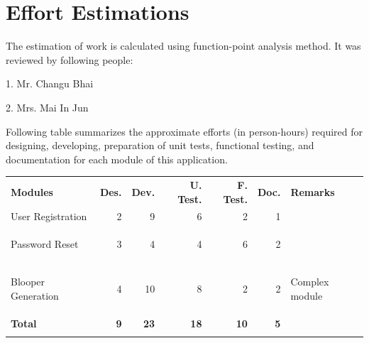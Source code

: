\documentclass{article}%
\begin{document}
\section{Effort Estimations}%

%
The estimation of work is calculated using function{-}point analysis method. It was reviewed by following people:%
\par%
1. Mr. Changu Bhai%
\par%
2. Mrs. Mai In Jun%
\par%
Following table summarizes the approximate efforts (in person{-}hours) required for designing, developing, preparation of unit tests, functional testing, and documentation for each module of this application.%
\par%
\vspace{0.5\baselineskip}%
\begin{longtable}[c]{lrrrrrl}%
\arrayrulecolor{cornflowerblue}%
\hline%
\rowcolor{babyblueeyes!60}%

\small{\color{darkblue}%
\textsf{\textbf{Modules}}}&
\small{\color{darkblue}%
\textsf{\textbf{Des.}}}&
\small{\color{darkblue}%
\textsf{\textbf{Dev.}}}&
\small{\color{darkblue}%
\textsf{\textbf{U. Test.}}}&
\small{\color{darkblue}%
\textsf{\textbf{F. Test.}}}&
\small{\color{darkblue}%
\textsf{\textbf{Doc.}}}&
\small{\color{darkblue}%
\textsf{\textbf{Remarks}}}\\%
\arrayrulecolor{cornflowerblue}%
\hline%
\hypertarget{ID:1472978607}{}%
\hypertarget{ID:168306167}{}%
\hypertarget{ID:95359505}{}%
\hypertarget{ID:392130114}{}%
\hypertarget{ID:1023999044}{}%
\hypertarget{ID:774531667}{}%
\hypertarget{ID:1707397738}{}%
\small{User Registration}&\small{2}&\small{9}&\small{6}&\small{2}&\small{1}&\small{}\\%
\hypertarget{ID:1777806651}{}%
\hypertarget{ID:135413322}{}%
\hypertarget{ID:1560408513}{}%
\hypertarget{ID:408225825}{}%
\hypertarget{ID:1258267957}{}%
\hypertarget{ID:155775457}{}%
\hypertarget{ID:663632266}{}%
\small{Password Reset}&\small{3}&\small{4}&\small{4}&\small{6}&\small{2}&\small{}\\%
\hypertarget{ID:1333512474}{}%
\hypertarget{ID:426462257}{}%
\hypertarget{ID:21972510}{}%
\hypertarget{ID:1179735166}{}%
\hypertarget{ID:715674083}{}%
\hypertarget{ID:1162468031}{}%
\hypertarget{ID:1184299058}{}%
\small{Blooper Generation}&\small{4}&\small{10}&\small{8}&\small{2}&\small{2}&\small{Complex module}\\%
\arrayrulecolor{cornflowerblue}%
\hline%
\rowcolor{babyblueeyes!10}%

\small{\color{darkblue}%
\textsf{\textbf{Total}}}&
\small{\color{darkblue}%
\textsf{\textbf{9}}}&
\small{\color{darkblue}%
\textsf{\textbf{23}}}&
\small{\color{darkblue}%
\textsf{\textbf{18}}}&
\small{\color{darkblue}%
\textsf{\textbf{10}}}&
\small{\color{darkblue}%
\textsf{\textbf{5}}}&\\%
\arrayrulecolor{cornflowerblue}%
\hline%
\end{longtable}%
\hypertarget{ID:906916785}{}%
\end{document}
